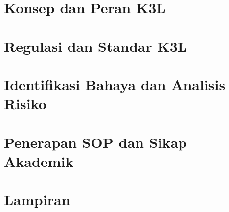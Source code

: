 \documentclass[12pt,a4paper]{article}
\begin{document}
\thispagestyle{empty}


\newpage

\tableofcontents
\newpage

\section{Konsep dan Peran K3L}
\label{sec:konsep-k3l}

\newpage

\section{Regulasi dan Standar K3L}
\label{sec:regulasi-k3l}

\newpage

\section{Identifikasi Bahaya dan Analisis Risiko}
\label{sec:identifikasi-bahaya}

\newpage

\section{Penerapan SOP dan Sikap Akademik}
\label{sec:penerapan-sop}

\newpage

    \newpage
    \printbibliography[heading=bibintoc, title={DAFTAR PUSTAKA}]
    \newpage
    \appendix
    \section*{Lampiran} %
    \renewcommand\thesection{\Alph{section}}
    
\end{document}
